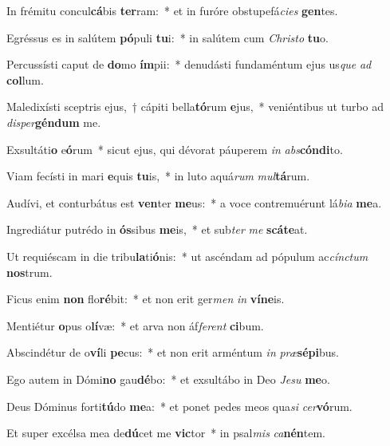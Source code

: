 \item In frémitu concul\textbf{cá}bis \textbf{ter}ram:~* et in furóre obstupefá\textit{ci}\textit{es} \textbf{gen}tes.
\item Egréssus es in salútem \textbf{pó}puli \textbf{tu}i:~* in salútem cum \textit{Chris}\textit{to} \textbf{tu}o.
\item Percussísti caput de \textbf{do}mo \textbf{ím}pii:~* denudásti fundaméntum ejus us\textit{que} \textit{ad} \textbf{col}lum.
\item Maledixísti sceptris ejus,~† cápiti bella\textbf{tó}rum \textbf{e}jus,~* veniéntibus ut turbo ad \textit{di}\textit{sper}\textbf{gén}\textbf{dum} me.
\item Exsultáti\textbf{o} e\textbf{ó}rum~* sicut ejus, qui dévorat páuperem \textit{in} \textit{abs}\textbf{cón}\textbf{di}to.
\item Viam fecísti in mari \textbf{e}quis \textbf{tu}is,~* in luto aquá\textit{rum} \textit{mul}\textbf{tá}rum.
\item Audívi, et conturbátus est \textbf{ven}ter \textbf{me}us:~* a voce contremuérunt lá\textit{bi}\textit{a} \textbf{me}a.
\item Ingrediátur putrédo in \textbf{ós}sibus \textbf{me}is,~* et sub\textit{ter} \textit{me} \textbf{scá}\textbf{te}at.
\item Ut requiéscam in die tribu\textbf{la}ti\textbf{ó}nis:~* ut ascéndam ad pópulum ac\textit{cínc}\textit{tum} \textbf{nos}trum.
\item Ficus enim \textbf{non} flo\textbf{ré}bit:~* et non erit ger\textit{men} \textit{in} \textbf{ví}\textbf{ne}is.
\item Mentiétur \textbf{o}pus o\textbf{lí}væ:~* et arva non áf\textit{fe}\textit{rent} \textbf{ci}bum.
\item Abscindétur de o\textbf{ví}li \textbf{pe}cus:~* et non erit arméntum \textit{in} \textit{præ}\textbf{sé}\textbf{pi}bus.
\item Ego autem in Dómi\textbf{no} gau\textbf{dé}bo:~* et exsultábo in Deo \textit{Je}\textit{su} \textbf{me}o.
\item Deus Dóminus forti\textbf{tú}do \textbf{me}a:~* et ponet pedes meos qua\textit{si} \textit{cer}\textbf{vó}rum.
\item Et super excélsa mea de\textbf{dú}cet me \textbf{vic}tor~* in psal\textit{mis} \textit{ca}\textbf{nén}tem.
